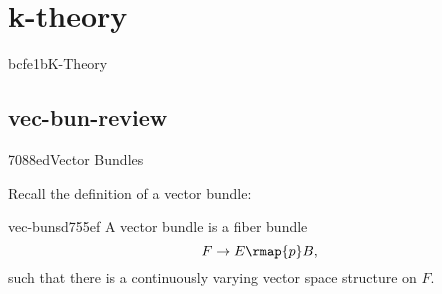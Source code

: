 \makeatletter{}\makeatother

\chapter{k-theory}{bcfe1b}{K-Theory}

\section{vec-bun-review}{7088ed}{Vector Bundles}

Recall the definition of a vector bundle:
\begin{defn}{vec-buns}{d755ef}
  A vector bundle is a fiber bundle 
  \[ F \to E \rmap{p} B, \]
  such that there is a continuously varying vector space structure on $F$. 
\end{defn}

\makeatletter{}\makeatother
